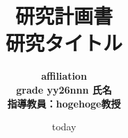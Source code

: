 \documentclass[uplatex,twocolumn]{jsarticle}
\begin{document}
\title{\normalsize 研究計画書\\ \LARGE \bf 研究タイトル}
\author{\bf affiliation\\ grade yy26nnn 氏名\\ \small 指導教員：hogehoge教授}
\date{today}
\maketitle






\end{document}
